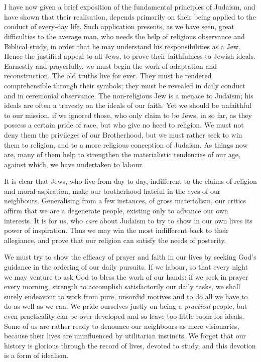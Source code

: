 \chapter{}

I have now given a brief exposition of the
fundamental principles of Judaism, and have
shown that their realisation, depends primarily
on their being applied to the conduct of
every-day life. Such application presents, as
we have seen, great difficulties to the average
man, who needs the help of religious observance
and Biblical study, in order that he may
understand his responsibilities as a Jew.
Hence the justified appeal to all Jews, to
prove their faithfulness to Jewish ideals.
Earnestly and prayerfully, we must begin
the work of adaptation and reconstruction.
The old truths live for ever. They must
be rendered comprehensible through their
symbols; they must be revealed in daily
conduct and in ceremonial observance. The
non-religious Jew is a menace to Judaism;
his ideals are often a travesty on the ideals
of our faith. Yet we should be unfaithful to
our mission, if we ignored those, who only
claim to be Jews, in so far, as they possess a
certain pride of race, but who give no heed
to religion. We must not deny them the
privileges of our Brotherhood, but we must
rather seek to win them to religion, and to a
more religious conception of Judaism. As
things now are, many of them help to
strengthen the materialistic tendencies of
our age, against which, we have undertaken
to labour.

It is clear that Jews, who live from day to
day, indifferent to the claims of religion and
moral aspiration, make our brotherhood
hateful in the eyes of our neighbours.
Generalising from a few instances, of gross
materialism, our critics affirm that we are a
degenerate people, existing only to advance
our own interests. It is for us, who \textsl{care}
about Judaism to try to show in our own lives
its power of inspiration. Thus we may win
the most indifferent back to their allegiance,
and prove that our religion can satisfy the
needs of posterity.

We must try to show the efficacy of
prayer and faith in our lives by seeking
God’s guidance in the ordering of our daily
pursuits. If we labour, so that every night
we may venture to ask God to bless the
work of our hands; if we seek in prayer
every morning, strength to accomplish
satisfactorily our daily tasks, we shall surely
endeavour to work from pure, unsordid motives
and to do all we have to do as well as we
can. We pride ourselves justly on being a
\textsl{practical} people, but even practicality can be
over developed and so leave too little room
for ideals. Some of us are rather ready to
denounce our neighbours as mere
visionaries, because their lives are uninfluenced by
utilitarian instincts. We forget that our
history is glorious through the record of
lives, devoted to study, and this devotion is a
form of idealism.

